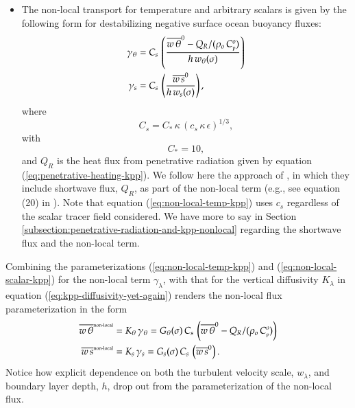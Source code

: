 \begin{itemize}
\item The non-local transport for temperature and arbitrary scalars is
  given by the following form for destabilizing negative surface ocean
  buoyancy fluxes:
\begin{align}
 \gamma_{\theta} &= 
   C_{s} \, \left( \frac{ \overline{w \, \theta}^{0} - Q_{R}/(\rho_{o} \, C_{\mbox{\tiny p}}^{o})  }{h \,  w_{\theta}(\sigma)}  
            \right) 
\label{eq:non-local-temp-kpp}
\\
 \gamma_{s} &= 
   C_{s} \, \left( \frac{ \overline{w \, s}^{0} }{h \,  w_{s}(\sigma)}  
            \right), 
\label{eq:non-local-scalar-kpp}
\end{align}
 where 
\begin{equation}
 C_{s} = C_{*} \, \kappa \, (c_{s} \, \kappa \, \epsilon)^{1/3},  
\label{eq:cs-and-cstar-defined}
\end{equation}
with 
\begin{equation}
 C_{*} = 10,
\label{eq:cstar-value-specified}
\end{equation}
and $Q_{R}$ is the heat flux from penetrative radiation given by
equation (\ref{eq:penetrative-heating-kpp}).  We follow here the
approach of \cite{LargeKPP}, in which they include shortwave flux,
$Q_{R}$, as part of the non-local term (e.g., see equation (20) in
\cite{LargeKPP}).  Note that equation (\ref{eq:non-local-temp-kpp})
uses $c_{s}$ regardless of the scalar tracer field considered.  We
have more to say in Section
\ref{subsection:penetrative-radiation-and-kpp-nonlocal} regarding the
shortwave flux and the non-local term.

\end{itemize}

Combining the parameterizations (\ref{eq:non-local-temp-kpp}) and
(\ref{eq:non-local-scalar-kpp}) for the non-local term
$\gamma_{\lambda}$, with that for the vertical diffusivity
$K_{\lambda}$ in equation (\ref{eq:kpp-diffusivity-yet-again}) renders
the non-local flux parameterization in the form
\begin{align}
\overline{w \, \theta}^{\mbox{\tiny non-local}} &= K_{\theta}  \, \gamma_{\theta}
  = 
 G_{\theta}(\sigma) \, C_{s} \, \left( \overline{w \, \theta}^{0} - Q_{R}/(\rho_{o} \, C_{\mbox{\tiny p}}^{o}) \right)
\label{eq:non-local-flux-kpp-param-temp}
\\
\overline{w \, s}^{\mbox{\tiny non-local}} &= K_{s}  \, \gamma_{s}
  = 
 G_{s}(\sigma) \, C_{s}\,\left( \overline{w \, s}^{0} \right).
\label{eq:non-local-flux-kpp-param-scalar}
\end{align}
Notice how explicit dependence on both the turbulent velocity scale,
$w_{\lambda}$, and boundary layer depth, $h$, drop out from the
parameterization of the non-local flux.  

